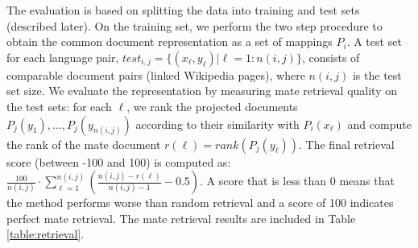 \documentclass[twoside,11pt]{article}
\begin{document}
{The evaluation is based on splitting the data into training and test sets (described later). On the training set, we perform the two step procedure to obtain the common document representation as a set of mappings $P_i$. A test set for each language pair, $test_{i,j} = \{(x_\ell,y_\ell) | \ell = 1:n(i,j)\} $, consists of comparable document pairs (linked Wikipedia pages), where $n(i,j)$ is the test set size. We evaluate the representation by measuring mate retrieval quality on the test sets: for each $\ell$, we rank the projected documents $P_j(y_1),\ldots, P_j(y_{n(i,j)})$ according to their similarity with $P_i(x_\ell)$ and compute the rank of the mate document $r(\ell) = rank(P_j(y_\ell))$. The final retrieval score (between -100 and 100) is computed as: $\frac{100}{n(i,j)} \cdot \sum_{\ell = 1}^{n(i,j)} \left( \frac{n(i,j) - r(\ell)}{n(i,j) -1} -0.5\right)$. A score that is less than 0 means that the method performs worse than random retrieval and a score of 100 indicates perfect mate retrieval. The mate retrieval results are included in Table \ref{table:retrieval}.

}
\end{document}
